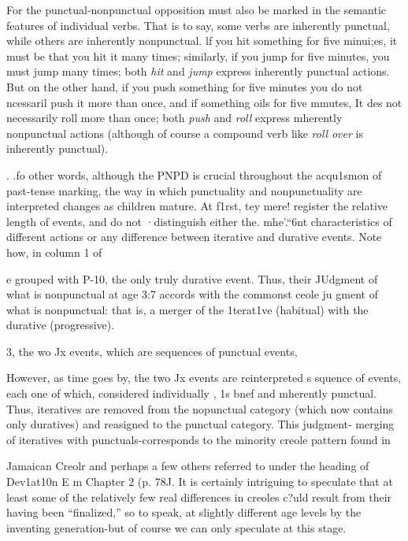 For the punctual-nonpunctual opposition must also be marked in the semantic features of individual verbs. That is to say, some verbs are inherently punctual, while others are inherently nonpunctual. lf you hit something for five minui;es, it must be that you hit it many
times; similarly, if you jump for five minutes, you must jump many times; both \textit{hit} and \textit{jump} express inherently punctual actions. But on the other hand, if you push something for five minutes you do not ncessaril push it more than once, and if something oils for five mmutes, It des not necessarily roll more than once; both \textit{push} and \textit{roll} express mherently nonpunctual actions (although of course a compound verb like \textit{roll} \textit{over} is inherently punctual).

. .fo other words, although the PNPD is crucial throughout the acqu1smon of past-tense marking, the way in which punctuality and nonpunctuality are interpreted changes as children mature. At f1rst, tey mere! register the relative length of events, and do not ·distinguish either the. mhe'.``6nt characteristics of different actions or any difference between iterative and durative events. Note how, in column 1 of

e grouped with P-10, the only truly durative event. Thus, their JUdgment of what is nonpunctual at age 3:7 accords with the common\-st ceole ju gment of what is nonpunctual: that is, a merger of the 1terat1ve (habitual) with the durative (progressive).

\begin{table}
\caption{3, the wo Jx events, which are sequences of punctual events,}
\label{tab:3}
\end{table}

However, as time goes by, the two Jx events are reinterpreted s squence of events, each one of which, considered individually , 1s bnef and mherently punctual. Thus, iteratives are removed from the nopunctual category (which now contains only duratives) and re\-asigned to the punctual category. This judgment- merging of iteratives with punctuals-corresponds to the minority creole pattern found in

Jamaican Creolr and perhaps a few others referred to under the heading of Dev1at10n E m Chapter 2 (p. 78J. It is certainly intriguing to speculate that at least some of the relatively few real differences in creoles c?uld result from their having been ``finalized,'' so to speak, at slightly
different age levels by the inventing generation-but of course we can only speculate at this stage.

